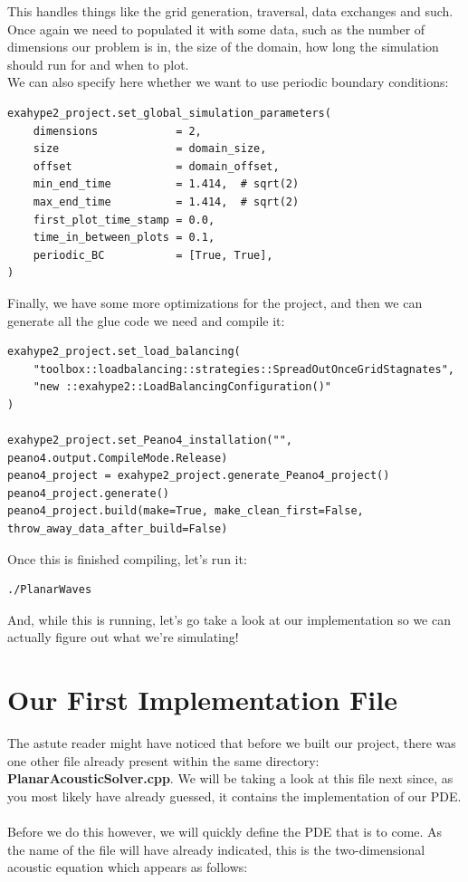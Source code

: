 \documentclass[12pt,letterpaper]{article}
\begin{document}
This handles things like the grid generation, traversal, data exchanges and such.
Once again we need to populated it with some data, such as the number of dimensions our problem is in,
the size of the domain, how long the simulation should run for and when to plot.\\

We can also specify here whether we want to use periodic boundary conditions:\\

\begin{lstlisting}[style = Python]
exahype2_project.set_global_simulation_parameters(
    dimensions            = 2,
    size                  = domain_size,
    offset                = domain_offset,
    min_end_time          = 1.414,  # sqrt(2)
    max_end_time          = 1.414,  # sqrt(2)
    first_plot_time_stamp = 0.0,
    time_in_between_plots = 0.1,
    periodic_BC           = [True, True],
)
\end{lstlisting}

Finally, we have some more optimizations for the project, and then we can generate all the glue code we need and compile it:\\

\begin{lstlisting}[style = Python]
exahype2_project.set_load_balancing(
    "toolbox::loadbalancing::strategies::SpreadOutOnceGridStagnates",
    "new ::exahype2::LoadBalancingConfiguration()"
)

exahype2_project.set_Peano4_installation("", peano4.output.CompileMode.Release)
peano4_project = exahype2_project.generate_Peano4_project()
peano4_project.generate()
peano4_project.build(make=True, make_clean_first=False, throw_away_data_after_build=False)
\end{lstlisting}

Once this is finished compiling, let's run it:\\

\begin{lstlisting}[style = Bash]
./PlanarWaves
\end{lstlisting}

And, while this is running, let's go take a look at our implementation so we can actually figure out what we're simulating!

\newpage

\section{Our First Implementation File}
The astute reader might have noticed that before we built our project, there was one other file already present within the same directory: \textbf{PlanarAcousticSolver.cpp}.
We will be taking a look at this file next since, as you most likely have already guessed, it contains the implementation of our PDE.
\\ \\
Before we do this however, we will quickly define the PDE that is to come. As the name of the file will have already indicated,
this is the two-dimensional acoustic equation which appears as follows:
\end{document}
